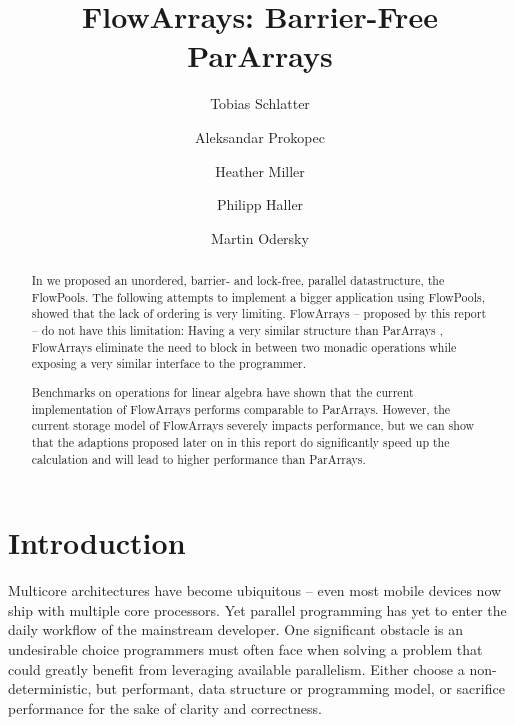 \documentclass[runningheads,a4paper,fleqn]{llncs}
\begin{document}
\title{FlowArrays: Barrier-Free ParArrays}
\author{Tobias Schlatter \and Aleksandar Prokopec \and
  Heather Miller \and Philipp Haller \and Martin
  Odersky}



\graphicspath{{figs/}}

\newcommand{\plot}[1]{}

\maketitle

\begin{abstract}
  In \cite{FP12} we proposed an unordered, barrier- and lock-free,
  parallel datastructure, the FlowPools. The following attempts to
  implement a bigger application using FlowPools, showed that the lack
  of ordering is very limiting. FlowArrays -- proposed by this report
  -- do not have this limitation: Having a very similar structure than
  ParArrays \cite{collect11}, FlowArrays eliminate the need to block
  in between two monadic operations while exposing a very similar
  interface to the programmer.

  Benchmarks on operations for linear algebra have shown that the
  current implementation of FlowArrays performs comparable to
  ParArrays. However, the current storage model of FlowArrays severely
  impacts performance, but we can show that the adaptions proposed
  later on in this report do significantly speed up the calculation
  and will lead to higher performance than ParArrays.
\end{abstract}

\section{Introduction}
Multicore architectures have become ubiquitous -- even most mobile devices now
ship with multiple core processors. Yet parallel programming has yet to enter
the daily workflow of the mainstream developer. One significant obstacle is an
undesirable choice programmers must often face when solving a problem that
could greatly benefit from leveraging available parallelism. Either choose a
non-deterministic, but performant, data structure or programming model, or
sacrifice performance for the sake of clarity and correctness.
\end{document}
